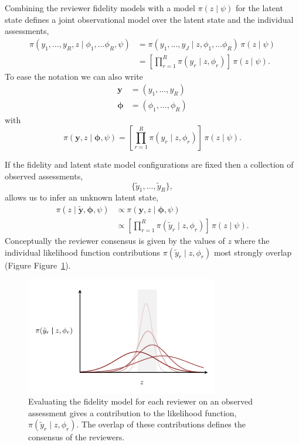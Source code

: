 \documentclass[
  letterpaper,
  DIV=11,
  numbers=noendperiod]{scrartcl}
\begin{document}
Combining the reviewer fidelity models with a model \(\pi(z \mid \psi)\)
for the latent state defines a joint observational model over the latent
state and the individual assessments, \begin{align*}
\pi( y_{1}, \ldots, y_{R}, z \mid \phi_{1}, \ldots \phi_{R}, \psi)
&=
\pi( y_{1}, \ldots, y_{J} \mid z, \phi_{1}, \ldots \phi_{R}) \,
\pi( z \mid \psi )
\\
&=
\left[ \prod_{r = 1}^{R} \pi( y_{r} \mid z, \phi_{r}) \right] \,
\pi( z \mid \psi).
\end{align*} To ease the notation we can also write \begin{align*}
\mathbf{y} &= (y_{1}, \ldots, y_{R})
\\
\boldsymbol{\phi} &= (\phi_{1}, \ldots, \phi_{R})
\end{align*} with \[
\pi( \mathbf{y}, z \mid \boldsymbol{\phi}, \psi)
=
\left[ \prod_{r = 1}^{R} \pi( y_{r} \mid z, \phi_{r}) \right] \,
\pi( z \mid \psi).
\]

If the fidelity and latent state model configurations are fixed then a
collection of observed assessments, \[
\{ \tilde{y}_{1}, \ldots, \tilde{y}_{R} \},
\] allows us to infer an unknown latent state, \begin{align*}
\pi( z \mid \tilde{\mathbf{y}}, \boldsymbol{\phi}, \psi)
&\propto
\pi( \mathbf{y}, z \mid \boldsymbol{\phi}, \psi)
\\
&\propto
\left[ \prod_{r = 1}^{R} \pi( \tilde{y}_{r} \mid z, \phi_{r}) \right] \,
\pi( z \mid \psi).
\end{align*} Conceptually the reviewer consensus is given by the values
of \(z\) where the individual likelihood function contributions
\(\pi( \tilde{y}_{r} \mid z, \phi_{r})\) most strongly overlap (Figure
Figure~\ref{fig-inferential-consensus}).

\begin{figure}

{\centering \includegraphics[width=0.75\textwidth,height=\textheight]{figures/inferential_consensus/inferential_consensus.pdf}

}

\caption{\label{fig-inferential-consensus}Evaluating the fidelity model
for each reviewer on an observed assessment gives a contribution to the
likelihood function, \(\pi( \tilde{y}_{r} \mid z, \phi_{r})\). The
overlap of these contributions defines the consensus of the reviewers.}

\end{figure}
\end{document}
